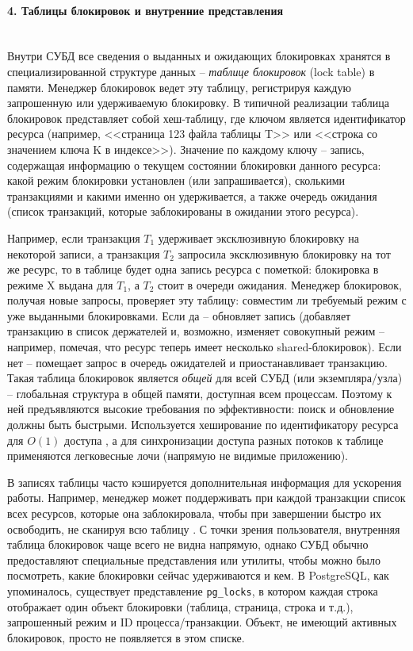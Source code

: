 \paragraph{4. Таблицы блокировок и внутренние представления} ~\\

 Внутри СУБД все сведения о выданных и ожидающих блокировках хранятся в специализированной структуре данных – \textit{таблице блокировок} (lock table) в памяти. Менеджер блокировок ведет эту таблицу, регистрируя каждую запрошенную или удерживаемую блокировку. В типичной реализации таблица блокировок представляет собой хеш-таблицу, где ключом является идентификатор ресурса (например, <<страница 123 файла таблицы T>> или <<строка со значением ключа K в индексе>>). Значение по каждому ключу – запись, содержащая информацию о текущем состоянии блокировки данного ресурса: какой режим блокировки установлен (или запрашивается), сколькими транзакциями и какими именно он удерживается, а также очередь ожидания (список транзакций, которые заблокированы в ожидании этого ресурса). 
 
 Например, если транзакция $T_1$ удерживает эксклюзивную блокировку на некоторой записи, а транзакция $T_2$ запросила эксклюзивную блокировку на тот же ресурс, то в таблице будет одна запись ресурса с пометкой: блокировка в режиме X выдана для $T_1$, а $T_2$ стоит в очереди ожидания. Менеджер блокировок, получая новые запросы, проверяет эту таблицу: совместим ли требуемый режим с уже выданными блокировками. Если да – обновляет запись (добавляет транзакцию в список держателей и, возможно, изменяет совокупный режим – например, помечая, что ресурс теперь имеет несколько shared-блокировок). Если нет – помещает запрос в очередь ожидателей и приостанавливает транзакцию. Такая таблица блокировок является \textit{общей} для всей СУБД (или экземпляра/узла) – глобальная структура в общей памяти, доступная всем процессам. Поэтому к ней предъявляются высокие требования по эффективности: поиск и обновление должны быть быстрыми. Используется хеширование по идентификатору ресурса для $O(1)$ доступа \autocite{DMSSMthed}, а для синхронизации доступа разных потоков к таблице применяются легковесные лочи (напрямую не видимые приложению). 
 
 В записях таблицы часто кэшируется дополнительная информация для ускорения работы. Например, менеджер может поддерживать при каждой транзакции список всех ресурсов, которые она заблокировала, чтобы при завершении быстро их освободить, не сканируя всю таблицу \autocite{Silberschatz}. С точки зрения пользователя, внутренняя таблица блокировок чаще всего не видна напрямую, однако СУБД обычно предоставляют специальные представления или утилиты, чтобы можно было посмотреть, какие блокировки сейчас удерживаются и кем. В PostgreSQL, как упоминалось, существует представление \texttt{pg\_locks}, в котором каждая строка отображает один объект блокировки (таблица, страница, строка и т.д.), запрошенный режим и ID процесса/транзакции. Объект, не имеющий активных блокировок, просто не появляется в этом списке.
 
